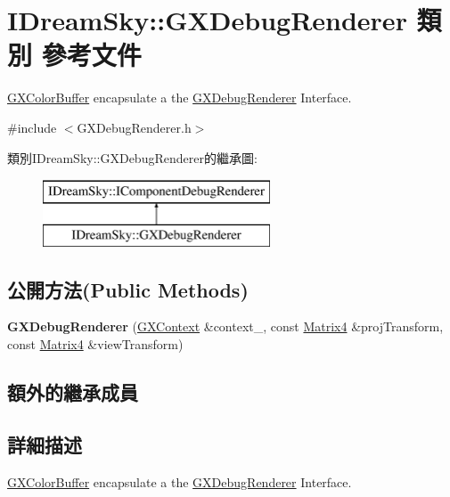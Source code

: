 \hypertarget{class_i_dream_sky_1_1_g_x_debug_renderer}{}\section{I\+Dream\+Sky\+:\+:G\+X\+Debug\+Renderer 類別 參考文件}
\label{class_i_dream_sky_1_1_g_x_debug_renderer}


\hyperlink{class_i_dream_sky_1_1_g_x_color_buffer}{G\+X\+Color\+Buffer} encapsulate a the \hyperlink{class_i_dream_sky_1_1_g_x_debug_renderer}{G\+X\+Debug\+Renderer} Interface.  




{\ttfamily \#include $<$G\+X\+Debug\+Renderer.\+h$>$}

類別\+I\+Dream\+Sky\+:\+:G\+X\+Debug\+Renderer的繼承圖\+:\begin{figure}[H]
\begin{center}
\leavevmode
\includegraphics[height=2.000000cm]{class_i_dream_sky_1_1_g_x_debug_renderer}
\end{center}
\end{figure}
\subsection*{公開方法(Public Methods)}
\begin{DoxyCompactItemize}
\item 
{\bfseries G\+X\+Debug\+Renderer} (\hyperlink{class_i_dream_sky_1_1_g_x_context}{G\+X\+Context} \&context\+\_\+, const \hyperlink{class_i_dream_sky_1_1_matrix4}{Matrix4} \&proj\+Transform, const \hyperlink{class_i_dream_sky_1_1_matrix4}{Matrix4} \&view\+Transform)\hypertarget{class_i_dream_sky_1_1_g_x_debug_renderer_a309ac314c444053c466709cb27a70b30}{}\label{class_i_dream_sky_1_1_g_x_debug_renderer_a309ac314c444053c466709cb27a70b30}

\end{DoxyCompactItemize}
\subsection*{額外的繼承成員}


\subsection{詳細描述}
\hyperlink{class_i_dream_sky_1_1_g_x_color_buffer}{G\+X\+Color\+Buffer} encapsulate a the \hyperlink{class_i_dream_sky_1_1_g_x_debug_renderer}{G\+X\+Debug\+Renderer} Interface. 

